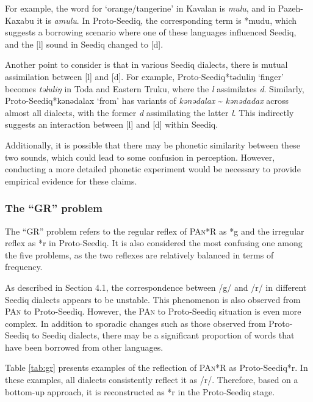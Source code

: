 \documentclass[12pt]{article}
\newcommand{\pan}{\textsc{PAn}\xspace}
\newcommand{\psedf}{Proto-Seediq\xspace}
\newcommand{\stof}{Toda\xspace}
\newcommand{\setrf}{Eastern Truku\xspace}
\begin{document}
For example, the word for `orange/tangerine' in Kavalan is \textit{mulu}, and in Pazeh-Kaxabu it is \textit{amulu}. In \psedf, the corresponding term is *mudu, which suggests a borrowing scenario where one of these languages influenced Seediq, and the [l] sound in Seediq changed to [d].

Another point to consider is that in various Seediq dialects, there is mutual assimilation between [l] and [d]. For example, \psedf *təduliŋ `finger' becomes \textit{təluliŋ} in \stof and \setrf, where the \textit{l} assimilates \textit{d}. Similarly, \psedf *kənədalax `from' has variants of \textit{kənədalax} \~{} \textit{kənədadax} across almost all dialects, with the former \textit{d} assimilating the latter \textit{l}. This indirectly suggests an interaction between [l] and [d] within Seediq. 

Additionally, it is possible that there may be phonetic similarity between these two sounds, which could lead to some confusion in perception. However, conducting a more detailed phonetic experiment would be necessary to provide empirical evidence for these claims.

\subsubsection{The ``GR'' problem}

The ``GR'' problem refers to the regular reflex of \pan *R as *g and the irregular reflex as *r in \psedf. It is also considered the most confusing one among the five problems, as the two reflexes are relatively balanced in terms of frequency.

As described in Section 4.1, the correspondence between /g/ and /r/ in different Seediq dialects appears to be unstable. This phenomenon is also observed from \pan to \psedf. However, the \pan to \psedf situation is even more complex. In addition to sporadic changes such as those observed from \psedf to Seediq dialects, there may be a significant proportion of words that have been borrowed from other languages.

Table \ref{tab:gr} presents examples of the reflection of \pan *R as \psedf *r. In these examples, all dialects consistently reflect it as /r/. Therefore, based on a bottom-up approach, it is reconstructed as *r in the \psedf stage.
\end{document}

